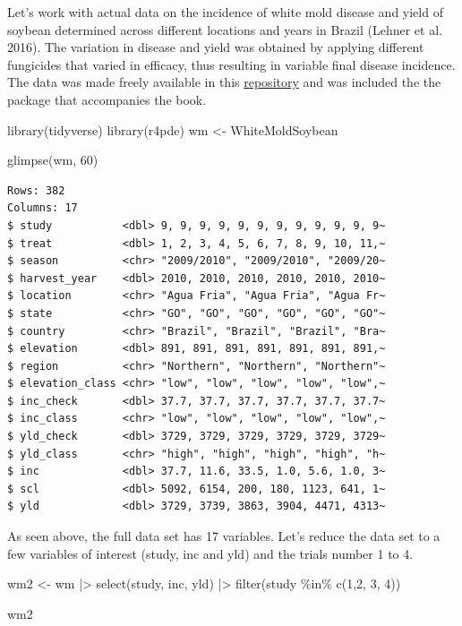 \documentclass[
  letterpaper,
]{book}
\newenvironment{Shaded}{\begin{snugshade}}{\end{snugshade}}
\newcommand{\DecValTok}[1]{\textcolor[rgb]{0.68,0.00,0.00}{#1}}
\newcommand{\FunctionTok}[1]{\textcolor[rgb]{0.28,0.35,0.67}{#1}}
\newcommand{\NormalTok}[1]{\textcolor[rgb]{0.00,0.23,0.31}{#1}}
\newcommand{\OtherTok}[1]{\textcolor[rgb]{0.00,0.23,0.31}{#1}}
\newcommand{\SpecialCharTok}[1]{\textcolor[rgb]{0.37,0.37,0.37}{#1}}
\begin{document}
Let's work with actual data on the incidence of white mold disease and
yield of soybean determined across different locations and years in
Brazil (Lehner et al. 2016). The variation in disease and yield was
obtained by applying different fungicides that varied in efficacy, thus
resulting in variable final disease incidence. The data was made freely
available in this
\href{https://github.com/emdelponte/paper-white-mold-meta-analysis}{repository}
and was included the the package that accompanies the book.

\begin{Shaded}
\begin{Highlighting}[]
\FunctionTok{library}\NormalTok{(tidyverse)}
\FunctionTok{library}\NormalTok{(r4pde)}
\NormalTok{wm }\OtherTok{\textless{}{-}}\NormalTok{ WhiteMoldSoybean}

\FunctionTok{glimpse}\NormalTok{(wm, }\DecValTok{60}\NormalTok{)}
\end{Highlighting}
\end{Shaded}

\begin{verbatim}
Rows: 382
Columns: 17
$ study           <dbl> 9, 9, 9, 9, 9, 9, 9, 9, 9, 9, 9, 9~
$ treat           <dbl> 1, 2, 3, 4, 5, 6, 7, 8, 9, 10, 11,~
$ season          <chr> "2009/2010", "2009/2010", "2009/20~
$ harvest_year    <dbl> 2010, 2010, 2010, 2010, 2010, 2010~
$ location        <chr> "Agua Fria", "Agua Fria", "Agua Fr~
$ state           <chr> "GO", "GO", "GO", "GO", "GO", "GO"~
$ country         <chr> "Brazil", "Brazil", "Brazil", "Bra~
$ elevation       <dbl> 891, 891, 891, 891, 891, 891, 891,~
$ region          <chr> "Northern", "Northern", "Northern"~
$ elevation_class <chr> "low", "low", "low", "low", "low",~
$ inc_check       <dbl> 37.7, 37.7, 37.7, 37.7, 37.7, 37.7~
$ inc_class       <chr> "low", "low", "low", "low", "low",~
$ yld_check       <dbl> 3729, 3729, 3729, 3729, 3729, 3729~
$ yld_class       <chr> "high", "high", "high", "high", "h~
$ inc             <dbl> 37.7, 11.6, 33.5, 1.0, 5.6, 1.0, 3~
$ scl             <dbl> 5092, 6154, 200, 180, 1123, 641, 1~
$ yld             <dbl> 3729, 3739, 3863, 3904, 4471, 4313~
\end{verbatim}

As seen above, the full data set has 17 variables. Let's reduce the data
set to a few variables of interest (study, inc and yld) and the trials
number 1 to 4.

\begin{Shaded}
\begin{Highlighting}[]
\NormalTok{wm2 }\OtherTok{\textless{}{-}}\NormalTok{ wm }\SpecialCharTok{|\textgreater{}} 
  \FunctionTok{select}\NormalTok{(study, inc, yld) }\SpecialCharTok{|\textgreater{}} 
  \FunctionTok{filter}\NormalTok{(study }\SpecialCharTok{\%in\%} \FunctionTok{c}\NormalTok{(}\DecValTok{1}\NormalTok{,}\DecValTok{2}\NormalTok{, }\DecValTok{3}\NormalTok{, }\DecValTok{4}\NormalTok{)) }

\NormalTok{wm2}
\end{Highlighting}
\end{Shaded}
\end{document}
